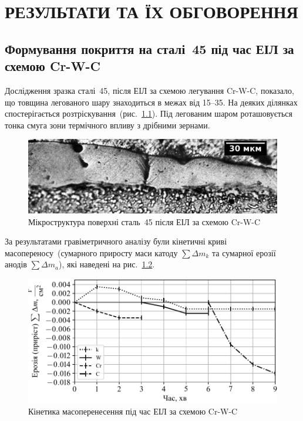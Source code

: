 \documentclass[a4paper,fontsize=14bp,ukrainian]{extreport}
\begin{document}
\chapter{РЕЗУЛЬТАТИ ТА ЇХ ОБГОВОРЕННЯ}

\section{Формування покриття на сталі~45 під час ЕІЛ за схемою Cr-W-C}

Дослідження зразка сталі~45, після ЕІЛ за схемою легування Cr-W-C, показало, що товщина легованого шару знаходиться в межах від \SIrange{15}{35}{\mkm}. На деяких ділянках спостерігається розтріскування~(рис.~\ref{fig:adapt_microstr_Cr-W-C}). Під легованим шаром роташовується тонка смуга зони термічного впливу з дрібними зернами.

\begin{figure}[H]
\centering \includegraphics[width=\textwidth]{adapt_gray_microstr_Cr-W-C.jpg}
\caption{Мікроструктура поверхні сталь~45 після ЕІЛ за схемою Cr-W-C}
\label{fig:adapt_microstr_Cr-W-C}
\end{figure}

За результатами гравіметричного аналізу були кінетичні криві масопереносу~(сумарного приросту маси катоду $\sum \Delta m_k$ та сумарної ерозії анодів $\sum \Delta m_a$), які наведені на рис.~\ref{fig:plt_gravi_Cr-W-C}.

\begin{figure}[H]
\centering  \includegraphics[]{plt_gravi_Cr-W-C.pdf}
\caption{Кінетика масоперенесення під час ЕІЛ за схемою Cr-W-C}
\label{fig:plt_gravi_Cr-W-C}
\end{figure}
\end{document}
